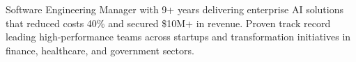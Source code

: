 

\begin{cvparagraph}


Software Engineering Manager with 9+ years delivering enterprise AI solutions that reduced costs 40\% and secured \$10M+ in revenue. Proven track record leading high-performance teams across startups and transformation initiatives in finance, healthcare, and government sectors.
\end{cvparagraph}
